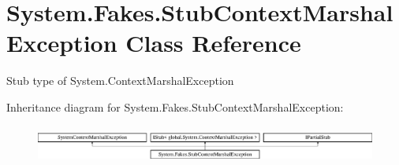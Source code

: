 \hypertarget{class_system_1_1_fakes_1_1_stub_context_marshal_exception}{\section{System.\-Fakes.\-Stub\-Context\-Marshal\-Exception Class Reference}
\label{class_system_1_1_fakes_1_1_stub_context_marshal_exception}
}


Stub type of System.\-Context\-Marshal\-Exception 


Inheritance diagram for System.\-Fakes.\-Stub\-Context\-Marshal\-Exception\-:\begin{figure}[H]
\begin{center}
\leavevmode
\includegraphics[height=1.257015cm]{class_system_1_1_fakes_1_1_stub_context_marshal_exception}
\end{center}
\end{figure}
